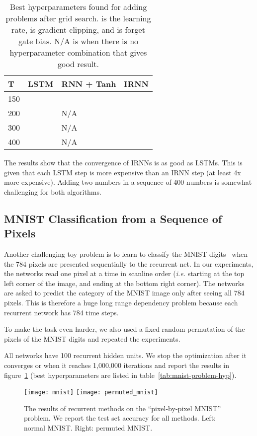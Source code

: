 \documentclass{article} \usepackage{nips14submit_e,times,graphicx}
\begin{document}
\begin{table}[h!]
\begin{small}
\centering
\begin{tabular}{|l|l|l|l|}
\hline
{\bf T}           &  {\bf LSTM}                 &  {\bf RNN + Tanh} & {\bf IRNN} \\\hline \hline
150               &     &    &        \\\hline 
200               &   &   N/A                  &        \\\hline 
300               &      &   N/A                  &        \\\hline 
400               &   &   N/A                  &        \\\hline 
\end{tabular}
\caption{Best hyperparameters found for adding problems after grid
  search.  is the learning rate,  is gradient clipping, and
   is forget gate bias. N/A is when there is no hyperparameter
  combination that gives good result.}
\label{tab:adding-problem-hyp}
\end{small}
\end{table}


The results show that the convergence of IRNNs is as good as
LSTMs. This is given that each LSTM step is more expensive than an
IRNN step (at least 4x more expensive). Adding two numbers in a
sequence of 400 numbers is somewhat challenging for both algorithms.


\subsection{MNIST Classification from a Sequence of Pixels}

Another challenging toy problem is to learn to classify the MNIST
digits~\cite{lecun98} when the 784 pixels are presented sequentially
to the recurrent net. In our experiments, the networks read one pixel
at a time in scanline order ({\it i.e.}  starting at the top left
corner of the image, and ending at the bottom right corner). The
networks are asked to predict the category of the MNIST image only
after seeing all 784 pixels. This is therefore a huge long range
dependency problem because each recurrent network has 784 time steps.

To make the task even harder, we also used a fixed random permutation
of the pixels of the MNIST digits and repeated the experiments.

All networks have 100 recurrent hidden units. We stop the optimization
after it converges or when it reaches 1,000,000 iterations and report
the results in figure~\ref{fig:mnist} (best hyperparameters are listed
in table~\ref{tab:mnist-problem-hyp}).
\begin{figure}[htb]
\centering
\texttt{[image: mnist]}
\texttt{[image: permuted\_mnist]}
\caption{The results of recurrent methods on the ``pixel-by-pixel
  MNIST'' problem. We report the test set accuracy for all
  methods. Left: normal MNIST. Right: permuted MNIST.}
\label{fig:mnist}
\end{figure}
\end{document}
